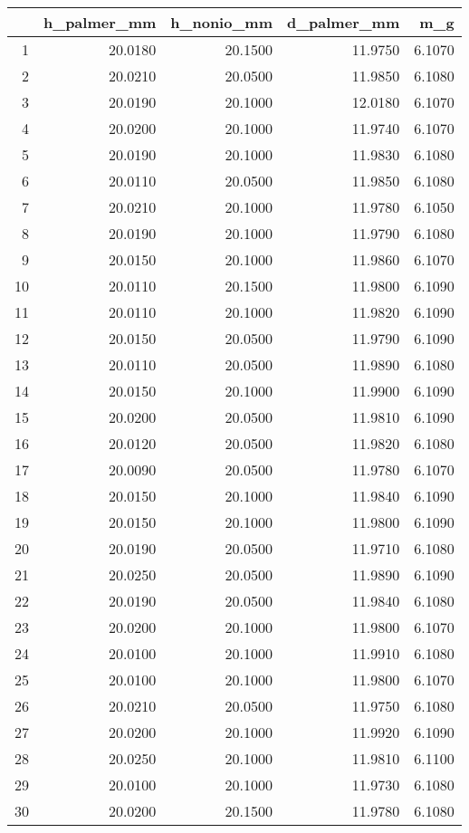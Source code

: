 \documentclass[11pt,a4paper,oneside,openany3] {report}
\begin{document}
\begin{table}[ht]
\centering
\begin{tabular}{rrrrr}
  \hline
 & h\_palmer\_mm & h\_nonio\_mm & d\_palmer\_mm & m\_g \\ 
  \hline
  1 & 20.0180 & 20.1500 & 11.9750 & 6.1070 \\ 
  2 & 20.0210 & 20.0500 & 11.9850 & 6.1080 \\ 
  3 & 20.0190 & 20.1000 & 12.0180 & 6.1070 \\ 
  4 & 20.0200 & 20.1000 & 11.9740 & 6.1070 \\ 
  5 & 20.0190 & 20.1000 & 11.9830 & 6.1080 \\ 
  6 & 20.0110 & 20.0500 & 11.9850 & 6.1080 \\ 
  7 & 20.0210 & 20.1000 & 11.9780 & 6.1050 \\ 
  8 & 20.0190 & 20.1000 & 11.9790 & 6.1080 \\ 
  9 & 20.0150 & 20.1000 & 11.9860 & 6.1070 \\ 
  10 & 20.0110 & 20.1500 & 11.9800 & 6.1090 \\ 
  11 & 20.0110 & 20.1000 & 11.9820 & 6.1090 \\ 
  12 & 20.0150 & 20.0500 & 11.9790 & 6.1090 \\ 
  13 & 20.0110 & 20.0500 & 11.9890 & 6.1080 \\ 
  14 & 20.0150 & 20.1000 & 11.9900 & 6.1090 \\ 
  15 & 20.0200 & 20.0500 & 11.9810 & 6.1090 \\ 
  16 & 20.0120 & 20.0500 & 11.9820 & 6.1080 \\ 
  17 & 20.0090 & 20.0500 & 11.9780 & 6.1070 \\ 
  18 & 20.0150 & 20.1000 & 11.9840 & 6.1090 \\ 
  19 & 20.0150 & 20.1000 & 11.9800 & 6.1090 \\ 
  20 & 20.0190 & 20.0500 & 11.9710 & 6.1080 \\ 
  21 & 20.0250 & 20.0500 & 11.9890 & 6.1090 \\ 
  22 & 20.0190 & 20.0500 & 11.9840 & 6.1080 \\ 
  23 & 20.0200 & 20.1000 & 11.9800 & 6.1070 \\ 
  24 & 20.0100 & 20.1000 & 11.9910 & 6.1080 \\ 
  25 & 20.0100 & 20.1000 & 11.9800 & 6.1070 \\ 
  26 & 20.0210 & 20.0500 & 11.9750 & 6.1080 \\ 
  27 & 20.0200 & 20.1000 & 11.9920 & 6.1090 \\ 
  28 & 20.0250 & 20.1000 & 11.9810 & 6.1100 \\ 
  29 & 20.0100 & 20.1000 & 11.9730 & 6.1080 \\ 
  30 & 20.0200 & 20.1500 & 11.9780 & 6.1080 \\ 
   \hline
\end{tabular}
\end{table}
\end{document}
